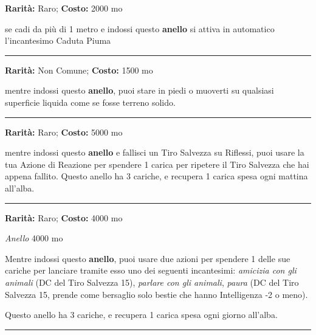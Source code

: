 \begin{multicols}{2}
\textbf{Rarità:} Raro; \textbf{Costo:} 2000 mo

se cadi da più di 1 metro e indossi questo \textbf{anello} si attiva in automatico l'incantesimo Caduta Piuma

\smallskip\noindent\rule{\linewidth}{2pt}  \hypertarget{AnellodiCamminaresull'Acqua}{}\smallskip{}\noindent\label{AnellodiCamminaresull'Acqua}

\textbf{Rarità:} Non Comune; \textbf{Costo:} 1500 mo

mentre indossi questo \textbf{anello}, puoi stare in piedi o muoverti su qualsiasi superficie liquida come se fosse terreno solido.

\smallskip\noindent\rule{\linewidth}{2pt}  \hypertarget{AnellodiElusione}{}\smallskip{}\noindent\label{AnellodiElusione}

\textbf{Rarità:} Raro; \textbf{Costo:} 5000 mo

mentre indossi questo \textbf{anello} e fallisci un Tiro Salvezza su Riflessi, puoi usare la tua Azione di Reazione per spendere 1 carica per ripetere il Tiro Salvezza che hai appena fallito. Questo anello ha 3 cariche, e recupera 1 carica spesa ogni mattina all'alba.

\smallskip\noindent\rule{\linewidth}{2pt}  \hypertarget{AnellodiInfluenzasugliAnimali}{}\smallskip{}\noindent\label{AnellodiInfluenzasugliAnimali}

\textbf{Rarità:} Raro; \textbf{Costo:} 4000 mo

\emph{Anello} 4000 mo

Mentre indossi questo \textbf{anello}, puoi usare due azioni per spendere 1 delle sue cariche per lanciare tramite esso uno dei seguenti incantesimi: \emph{amicizia con gli animali} (DC del Tiro Salvezza 15), \emph{parlare con gli animali}, \emph{paura} (DC del Tiro Salvezza 15, prende come bersaglio solo bestie che hanno Intelligenza -2 o meno).

Questo anello ha 3 cariche, e recupera 1 carica spesa ogni giorno all'alba.

\smallskip\noindent\rule{\linewidth}{2pt}  \hypertarget{AnellodiInvisibilità}{}\smallskip{}\noindent\label{AnellodiInvisibilità}


\end{multicols}
